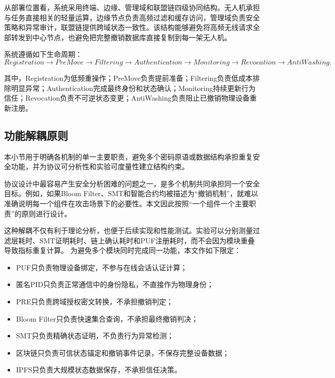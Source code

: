 \documentclass[conference]{IEEEtran}
\begin{document}
	从部署位置看，系统采用终端、边缘、管理域和联盟链四级协同结构。无人机承担与任务直接相关的轻量运算，边缘节点负责高频过滤和缓存访问，管理域负责安全策略和异常审计，联盟链提供跨域状态一致性。该结构能够避免将高频无线请求全部转发到中心节点，也避免把完整撤销数据库直接复制到每一架无人机。
	
	系统遵循如下生命周期：
	\begin{equation}
		Registration\rightarrow PreMove\rightarrow Filtering\rightarrow
		Authentication\rightarrow Monitoring\rightarrow Revocation\rightarrow AntiWashing.
	\end{equation}
	
	其中，Registration为低频重操作；PreMove负责提前准备；Filtering负责低成本排除明显异常；Authentication完成最终身份和状态确认；Monitoring持续更新行为信任；Revocation负责不可逆状态变更；AntiWashing负责阻止已撤销物理设备重新注册。
	
	\subsection{功能解耦原则}
	
	本小节用于明确各机制的单一主要职责，避免多个密码原语或数据结构承担重复安全功能，并为协议可分析性和实验可度量性建立结构约束。
	
	协议设计中最容易产生安全分析困难的问题之一，是多个机制共同承担同一个安全目标。例如，如果Bloom Filter、SMT和智能合约均被描述为“撤销机制”，就难以准确说明每一个组件在攻击场景下的必要性。本文因此按照“一个组件一个主要职责”的原则进行设计。
	
	这种解耦不仅有利于理论分析，也便于后续实现和性能测试。实验可以分别测量过滤层耗时、SMT证明耗时、链上确认耗时和PUF注册耗时，而不会因为模块重叠导致指标重复计算。
	为避免多个模块同时完成同一功能，本文作如下限定：
	\begin{itemize}
		\item PUF只负责物理设备绑定，不参与在线会话认证计算；
		\item 匿名PID只负责正常通信中的身份隐私，不直接作为物理身份；
		\item PRE只负责跨域授权密文转换，不承担撤销判定；
		\item Bloom Filter只负责快速集合查询，不承担最终撤销判决；
		\item SMT只负责精确状态证明，不负责行为异常检测；
		\item 区块链只负责可信状态锚定和撤销事件记录，不保存完整设备数据；
		\item IPFS只负责大规模状态数据保存，不承担信任决策。
	\end{itemize}
	
\end{document}

